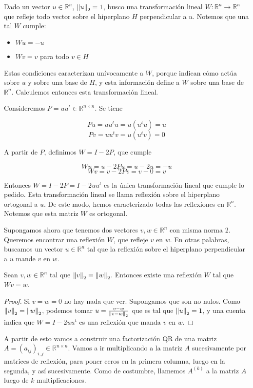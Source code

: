 Dado un vector $u \in \mathbb{R}^n$, $\left\lVert u\right\rVert_2 = 1$, busco una transformación lineal $W : \mathbb{R}^n \to \mathbb{R}^n$ que refleje todo vector sobre el hiperplano $H$ perpendicular a $u$. Notemos que una tal $W$ cumple:

\begin{itemize}
\item $Wu = -u$
\item $Wv = v$ para todo $v \in H$
\end{itemize}

Estas condiciones caracterizan unívocamente a $W$, porque indican cómo actúa sobre $u$ y sobre una base de $H$, y esta información define a $W$ sobre una base de $\mathbb{R}^n$. Calculemos entonces esta transformación lineal.

Consideremos $P = uu^t \in \mathbb{R}^{n \times n}$. Se tiene

\[Pu = uu^tu = u(u^tu) = u\]
\[Pv = uu^tv = u(u^tv) = 0\]

A partir de $P$, definimos $W = I - 2P$, que cumple

\[Wu = u - 2Pu = u - 2u = -u\]
\[Wv = v - 2Pv = v - 0 = v\]

Entonces $W = I - 2P = I - 2uu^t$ es la única transformación lineal que cumple lo pedido. Esta transformación lineal se llama reflexión sobre el hiperplano ortogonal a $u$. De este modo, hemos caracterizado todas las reflexiones en $\mathbb{R}^n$. Notemos que esta matriz $W$ es ortogonal.

Supongamos ahora que tenemos dos vectores $v, w \in \mathbb{R}^n$ con misma norma 2. Queremos encontrar una reflexión $W$, que refleje $v$ en $w$. En otras palabras, buscamos un vector $u \in \mathbb{R}^n$ tal que la reflexión sobre el hiperplano perpendicular a $u$ mande $v$ en $w$.

\begin{propo}
Sean $v, w \in \mathbb{R}^n$ tal que $\left\lVert v\right\rVert_2 = \left\lVert w\right\rVert_2$. Entonces existe una reflexión $W$ tal que $Wv = w$.

\begin{proof}
Si $v = w = 0$ no hay nada que ver. Supongamos que son no nulos. Como $\left\lVert v\right\rVert_2 = \left\lVert w\right\rVert_2$, podemos tomar $u = \frac{v - w}{\left\lVert v - w\right\rVert_2}$ que es tal que $\left\lVert u\right\rVert_2 = 1$, y una cuenta indica que $W = I - 2uu^t$ es una reflexión que manda $v$ en $w$.
\end{proof}
\end{propo}

A partir de esto vamos a construir una factorización QR de una matriz $A = (a_{ij})_{i, j} \in \mathbb{R}^{n \times n}$. Vamos a ir multiplicando a la matriz $A$ sucesivamente por matrices de reflexión, para poner ceros en la primera columna, luego en la segunda, y así sucesivamente. Como de costumbre, llamemos $A^{(k)}$ a la matriz $A$ luego de $k$ multiplicaciones.


